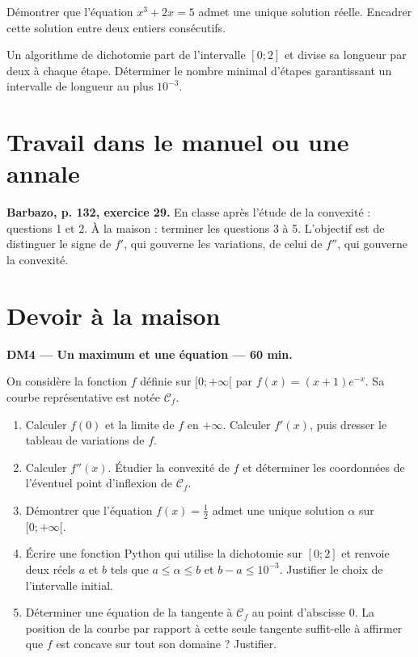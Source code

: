 Démontrer que l'équation $x^3+2x=5$ admet une unique solution réelle. Encadrer cette solution entre deux entiers consécutifs.

Un algorithme de dichotomie part de l'intervalle $[0;2]$ et divise sa longueur par deux à chaque étape. Déterminer le nombre minimal d'étapes garantissant un intervalle de longueur au plus $10^{-3}$.

\section{Travail dans le manuel ou une annale}\textbf{Barbazo, p. 132, exercice 29.} En classe après l'étude de la convexité : questions 1 et 2. À la maison : terminer les questions 3 à 5. L'objectif est de distinguer le signe de $f'$, qui gouverne les variations, de celui de $f''$, qui gouverne la convexité.

\section{Devoir à la maison}\textbf{DM4 --- Un maximum et une équation --- 60 min.}\par On considère la fonction $f$ définie sur $[0;+\infty[$ par $f(x)=(x+1)e^{-x}$. Sa courbe représentative est notée $\mathcal C_f$.
\begin{enumerate}\item Calculer $f(0)$ et la limite de $f$ en $+\infty$. Calculer $f' (x)$, puis dresser le tableau de variations de $f$.
\item Calculer $f'' (x)$. Étudier la convexité de $f$ et déterminer les coordonnées de l'éventuel point d'inflexion de $\mathcal C_f$.
\item Démontrer que l'équation $f(x)=\frac12$ admet une unique solution $\alpha$ sur $[0;+\infty[$.
\item Écrire une fonction Python qui utilise la dichotomie sur $[0;2]$ et renvoie deux réels $a$ et $b$ tels que $a\le\alpha\le b$ et $b-a\le10^{-3}$. Justifier le choix de l'intervalle initial.
\item Déterminer une équation de la tangente à $\mathcal C_f$ au point d'abscisse $0$. La position de la courbe par rapport à cette seule tangente suffit-elle à affirmer que $f$ est concave sur tout son domaine ? Justifier.\end{enumerate}

